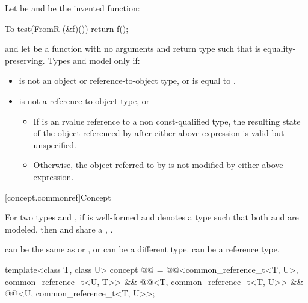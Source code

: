 \begin{itemdescr}
\pnum
Let  be  and
 be the invented function:
\begin{codeblock}
To test(FromR (&f)()) {
  return f();
}
\end{codeblock}
and let  be a function with no arguments and return type 
such that  is equality-preserving.
Types  and  model 
only if:

\begin{itemize}
\item
{} is not an object or reference-to-object type, or
 is equal to .

\item
{} is not a reference-to-object type, or

\begin{itemize}
\item
If  is an rvalue reference to a non const-qualified type, the
resulting state of the object referenced by  after either above
expression is valid but unspecified.

\item
Otherwise, the object referred to by  is not modified by either above
expression.
\end{itemize}
\end{itemize}
\end{itemdescr}


[concept.commonref]{Concept }

\pnum
For two types  and , if 
is well-formed and denotes a type  such that both
and
are modeled, then  and  share a
, .
\begin{note}
 can be the same as  or , or can be a
different type.  can be a reference type.
\end{note}

\begin{itemdecl}
template<class T, class U>
  concept @@ =
    @@<common_reference_t<T, U>, common_reference_t<U, T>> &&
    @@<T, common_reference_t<T, U>> &&
    @@<U, common_reference_t<T, U>>;
\end{itemdecl}

